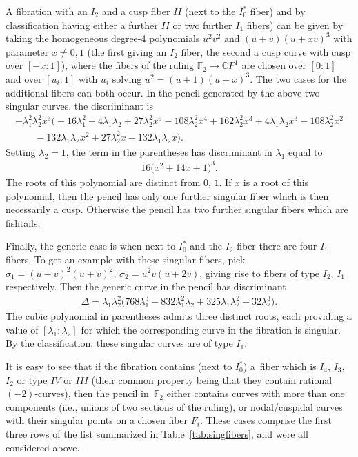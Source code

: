 \documentclass[pdftex]{sigma}
\newcommand{\CP}[1]{\mathbb{C}P^{#1}} %
\numberwithin{equation}{section}
\begin{document}
\begin{Example}A fibration with an $I_2$ and a cusp fiber $II$ (next to the $I_0^*$
fiber) and by classification having either a further $II$ or two
further $I_1$ fibers) can be given by taking the homogeneous degree-4
polynomials $u^2v^2$ and $(u+v)(u+xv)^3$ with parameter $x\neq 0, 1$
(the first giving an $I_2$ fiber, the second a cusp curve with cusp
over $[-x:1]$), where the fibers of the ruling ${\mathbb {F}}_2\to
\CP{1}$ are chosen over $[0:1]$ and over $[u_i:1]$ with $u_i$ solving
$u^2=(u+1)(u+x)^3$. The two cases for the additional fibers can both
occur. In the pencil generated by the above two singular curves, the
discriminant is
\begin{gather*}
-\lambda _1^2 \lambda _2^2 x^3 \big({-}16 \lambda _1^2+4 \lambda _1 \lambda _2+ 27 \lambda _2^2 x^5-108 \lambda _2^2 x^4+162
 \lambda _2^2 x^3+4 \lambda _1 \lambda _2 x^3-108 \lambda _2^2 x^2 \\
\qquad{} -132 \lambda _1 \lambda _2 x^2+27 \lambda _2^2 x-132 \lambda _1 \lambda _2 x\big).
\end{gather*}
Setting $\lambda _2=1$, the term in the parentheses has discriminant
in $\lambda_1$ equal to
\begin{gather*}
	16 \big(x^2+14 x+1\big)^3.
\end{gather*}
The roots of this polynomial are distinct from $0$, $1$. If $x$ is a
root of this polynomial, then the pencil has only one further singular
fiber which is then necessarily a cusp. Otherwise the pencil has two
further singular fibers which are fishtails.

Finally, the generic case is when next to $I_0^*$ and the $I_2$ fiber
there are four $I_1$ fibers. To get an example with these singular
fibers, pick $\sigma_1 = (u-v)^2 (u+v)^2$, $\sigma_2 = u^2 v (u+2v)$,
giving rise to fibers of type $I_2$, $I_1$ respectively. Then the
generic curve in the pencil has discriminant
\begin{gather*}
 \Delta = \lambda_1 \lambda_2^2 \big(768 \lambda_1^3 - 832 \lambda_1^2 \lambda_2 + 325 \lambda_1 \lambda_2^2 -32 \lambda_2^3\big).
\end{gather*}
The cubic polynomial in parentheses admits three distinct roots, each providing a value of $[\lambda_1 : \lambda_2]$
for which the corresponding curve in the fibration is singular. By the classification, these singular curves are of type $I_1$.
\end{Example}

It is easy to see that if the fibration contains (next to $I_0^*$) a~fiber which is $I_4$, $I_3$, $I_2$ or type $IV$ or $III$ (their common property
being that they contain rational $(-2)$-curves), then the pencil in~${\mathbb {F}}_2$
either contains curves with more than one components (i.e., unions
of two sections of the ruling), or nodal/cuspidal curves with their
singular points on a chosen fiber $F_i$. These cases comprise the first three rows
of the list summarized in Table~\ref{tab:singfibers}, and were all considered above.
\end{document}

